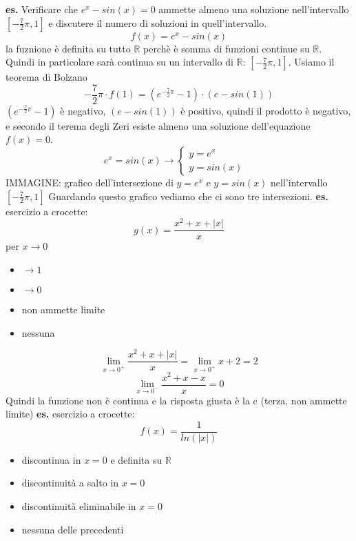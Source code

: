 \newline
\newline
\textbf{es.} Verificare che $e^x-sin(x) = 0$ ammette almeno una soluzione nell'intervallo $[-\frac{7}{2}\pi, 1]$ e discutere il numero di soluzioni in quell'intervallo.
\[
    f(x) = e^x -sin(x)
\]
la fuznione è definita su tutto $\mathbb{R}$ perchè è somma di funzioni continue su $\mathbb{R}$. Quindi in particolare sarà continua su un intervallo di $\mathbb{R}$: $[-\frac{7}{2}\pi, 1]$.
\newline
Usiamo il teorema di Bolzano
\[
    -\frac{7}{2}\pi \cdot f(1) = (e^{-\frac{7}{2}\pi} -1) \cdot (e-sin(1))
\]
$(e^{-\frac{7}{2}\pi} -1)$ è negativo, $(e-sin(1))$ è positivo, quindi il prodotto è negativo, e secondo il terema degli Zeri esiste almeno una soluzione dell'equazione $f(x) = 0$.
\[
    e^x = sin(x) \rightarrow \begin{cases}
        y=e^x &\\
        y= sin(x) &
    \end{cases}
\]
IMMAGINE: grafico dell'intersezione di $y=e ^x$ e $y=sin(x)$ nell'intervallo $[-\frac{7}{2}\pi, 1]$
\newline
Guardando questo grafico vediamo che ci sono tre intersezioni.
\newline
\newline
\newline
\textbf{es.} esercizio a crocette:
\[
    g(x) = \frac{x^2+x+|x|}{x}
\]
per $x \rightarrow  0$
\begin{itemize}
    \item $\rightarrow 1$
    \item $\rightarrow 0$
    \item non ammette limite
    \item nessuna
\end{itemize}
\[
    \lim_{x\rightarrow 0^+} \frac{x^2+x+|x|}{x} = \lim_{x\rightarrow 0^+} x+2 = 2
\]
\[
    \lim_{x\rightarrow  0^-} \frac{x^2 +x -x}{x} = 0
\]
Quindi la funzione non è continua e la risposta giusta è la c (terza, non ammette limite)
\newline
\newline
\newline
\textbf{es.} esercizio a crocette:
\[
    f(x) = \frac{1}{ln(|x|)}
\]
\begin{itemize}
    \item discontinua in $x = 0$ e definita su $\mathbb{R}$
    \item discontinuità a salto in $x=0$ 
    \item discontinuità eliminabile in $x=0$
    \item nessuna delle precedenti
\end{itemize}

